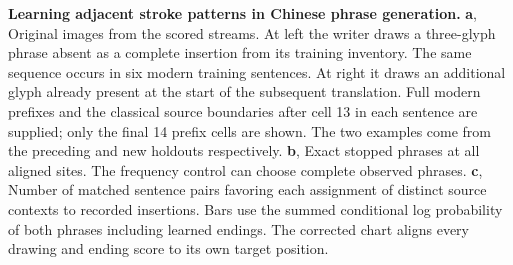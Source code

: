 \textbf{Learning adjacent stroke patterns in Chinese phrase generation.}
\textbf{a}, Original images from the scored streams. At left the writer draws a three-glyph phrase absent as a complete insertion from its training inventory. The same sequence occurs in six modern training sentences. At right it draws an additional glyph already present at the start of the subsequent translation. Full modern prefixes and the classical source boundaries after cell 13 in each sentence are supplied; only the final 14 prefix cells are shown. The two examples come from the preceding and new holdouts respectively.
\textbf{b}, Exact stopped phrases at all aligned sites. The frequency control can choose complete observed phrases. \textbf{c}, Number of matched sentence pairs favoring each assignment of distinct source contexts to recorded insertions. Bars use the summed conditional log probability of both phrases including learned endings. The corrected chart aligns every drawing and ending score to its own target position.
